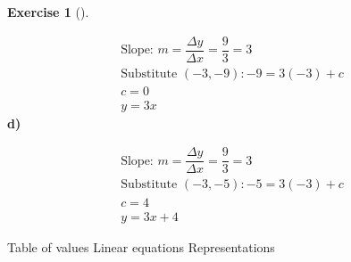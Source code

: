 \documentclass[
  letterpaper,
  DIV=11,
  numbers=noendperiod]{scrreprt}
\theoremstyle{definition}
\newtheorem{exercise}{Exercise}[chapter]
\theoremstyle{remark}
\begin{document}
\begin{exercise}[]
\begin{tcolorbox}
\[
\begin{aligned}
\text{Slope: } m = \dfrac{\Delta y}{\Delta x} = \dfrac{9}{3} = 3 \\[4pt] \text{Substitute } (-3, -9): -9 = 3(-3) + c \\[4pt] c = 0 \\[4pt] y = 3x
\end{aligned}
\] \textbf{d)}

\[
\begin{aligned}
\text{Slope: } m = \dfrac{\Delta y}{\Delta x} = \dfrac{9}{3} = 3 \\[4pt] \text{Substitute } (-3, -5): -5 = 3(-3) + c \\[4pt] c = 4 \\[4pt] y = 3x + 4
\end{aligned}
\]

\end{tcolorbox}

{Table of values} {Linear equations} {Representations}

\end{exercise}
\end{document}
